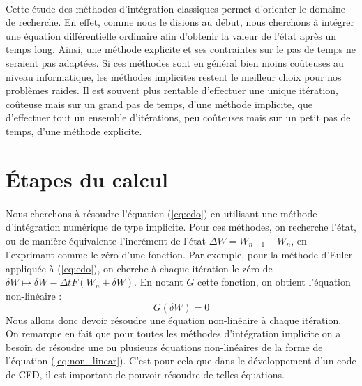 \paragraph{}
Cette étude des méthodes d'intégration classiques permet d'orienter le domaine de recherche.
En effet, comme nous le disions au début, nous cherchons à intégrer une équation différentielle ordinaire afin d'obtenir la valeur de l'état après un temps long.
Ainsi, une méthode explicite et ses contraintes sur le pas de temps ne seraient pas adaptées.
Si ces méthodes sont en général bien moins coûteuses au niveau informatique, les méthodes implicites restent le meilleur choix pour nos problèmes raides.
Il est souvent plus rentable d'effectuer une unique itération, coûteuse mais sur un grand pas de temps, d'une méthode implicite, que d'effectuer tout un ensemble d'itérations, peu coûteuses mais sur un petit pas de temps, d'une méthode explicite.


\section{Étapes du calcul}

	\paragraph{}
	Nous cherchons à résoudre l'équation (\ref{eq:edo}) en utilisant une méthode d'intégration numérique de type implicite.
  Pour ces méthodes, on recherche l'état, ou de manière équivalente l'incrément de l'état $\Delta W = W_{n+1} - W_n$, en l'exprimant comme le zéro d'une fonction.
  Par exemple, pour la méthode d'Euler appliquée à (\ref{eq:edo}), on cherche à chaque itération le zéro de $\delta W \mapsto \delta W - \Delta t F\left(W_n + \delta W\right)$.
	En notant $G$ cette fonction, on obtient l'équation non-linéaire :
	\begin{equation}\label{eq:non_linear}
		G\left(\delta W\right) = 0
	\end{equation}
	Nous allons donc devoir résoudre une équation non-linéaire à chaque itération.
  On remarque en fait que pour toutes les méthodes d'intégration implicite on a besoin de résoudre une ou plusieurs équations non-linéaires de la forme de l'équation (\ref{eq:non_linear}).
  C'est pour cela que dans le développement d'un code de CFD, il est important de pouvoir résoudre de telles équations.

